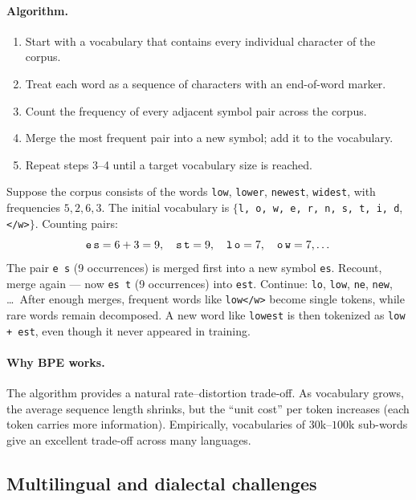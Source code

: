 \paragraph{Algorithm.}
\begin{enumerate}
    \item Start with a vocabulary that contains every individual character of the corpus.
    \item Treat each word as a sequence of characters with an end-of-word marker.
    \item Count the frequency of every adjacent symbol pair across the corpus.
    \item Merge the most frequent pair into a new symbol; add it to the vocabulary.
    \item Repeat steps 3--4 until a target vocabulary size is reached.
\end{enumerate}

\begin{example}
Suppose the corpus consists of the words \texttt{low}, \texttt{lower}, \texttt{newest}, \texttt{widest}, with frequencies $5, 2, 6, 3$. The initial vocabulary is $\{$\texttt{l, o, w, e, r, n, s, t, i, d}, \texttt{</w>}$\}$. Counting pairs:
\[ \texttt{e\,s} = 6 + 3 = 9,\quad \texttt{s\,t} = 9,\quad \texttt{l\,o} = 7, \quad \texttt{o\,w} = 7, \dots \]
The pair \texttt{e\,s} (9 occurrences) is merged first into a new symbol \texttt{es}. Recount, merge again --- now \texttt{es\,t} (9 occurrences) into \texttt{est}. Continue: \texttt{lo}, \texttt{low}, \texttt{ne}, \texttt{new}, \dots\ After enough merges, frequent words like \texttt{low</w>} become single tokens, while rare words remain decomposed. A new word like \texttt{lowest} is then tokenized as \texttt{low + est}, even though it never appeared in training.
\end{example}

\paragraph{Why BPE works.} The algorithm provides a natural rate--distortion trade-off. As vocabulary grows, the average sequence length shrinks, but the ``unit cost'' per token increases (each token carries more information). Empirically, vocabularies of $30$k--$100$k sub-words give an excellent trade-off across many languages.

\subsection{Multilingual and dialectal challenges}

